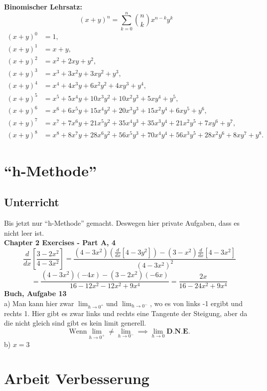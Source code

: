 \documentclass{report}
\begin{document}
\textbf{Binomischer Lehrsatz:}
\[(x+y)^n = \sum_{k=0}^{n}\binom{n}{k} x^{n-k}y^{k} \quad\]
\begin{align*}
(x+y)^0 & = 1, \\[8pt]
(x+y)^1 & = x + y, \\[8pt]
(x+y)^2 & = x^2 + 2xy + y^2, \\[8pt]
(x+y)^3 & = x^3 + 3x^2y + 3xy^2 + y^3, \\[8pt]
(x+y)^4 & = x^4 + 4x^3y + 6x^2y^2 + 4xy^3 + y^4, \\[8pt]
(x+y)^5 & = x^5 + 5x^4y + 10x^3y^2 + 10x^2y^3 + 5xy^4 + y^5, \\[8pt]
(x+y)^6 & = x^6 + 6x^5y + 15x^4y^2 + 20x^3y^3 + 15x^2y^4 + 6xy^5 + y^6, \\[8pt]
(x+y)^7 & = x^7 + 7x^6y + 21x^5y^2 + 35x^4y^3 + 35x^3y^4 + 21x^2y^5 + 7xy^6 + y^7, \\[8pt]
(x+y)^8 & = x^8 + 8x^7y + 28x^6y^2 + 56x^5y^3 + 70x^4y^4 + 56x^3y^5 + 28x^2y^6 + 8xy^7 + y^8.
\end{align*}
\clearpage

\section{``h-Methode''}
\subsection{Unterricht}
Bis jetzt nur ``h-Methode'' gemacht. Deswegen hier private Aufgaben, dass es nicht leer ist.
\\\textbf{Chapter 2 Exercises - Part A, 4}
\[\frac{d}{dx}\left[\frac{3-2x^2}{4-3x^2}\right]= \frac{(4-3x^2)\left( \frac{d}{dx}\left[4-3y^2\right]
 \right)-(3-x^2)\frac{d}{dx}\left[4-3x^2\right]
}{\left( 4-3x^2 \right)^2 }\]\[= \frac{(4-3x^2)(-4x)-(3-2x^2)(-6x)}{16-12x^2-12x^2+9x^4}= \frac{2x}{16-24x^2+9x^4} \]
\textbf{Buch, Aufgabe 13}
\\a) Man kann hier zwar $\lim_{h \to 0^+ } $und $ \lim_{h \to 0^-}$, wo es von links -1 ergibt und rechts 1. Hier gibt es zwar links und rechts eine Tangente der Steigung, aber da die nicht gleich sind gibt es kein limit generell.
\[ \text{Wenn} \lim_{h \to 0^+ } \ne \lim_{h \to 0^-} \implies \lim_{h \to 0} \textbf{D.N.E.}\]
b) $x=3$

\clearpage
\section{Arbeit Verbesserung}
\end{document}
